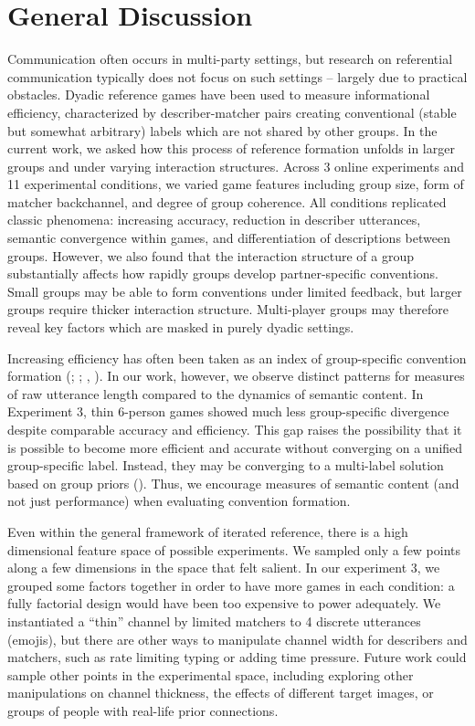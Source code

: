 \documentclass[
  english,
]{article}
\begin{document}
\section{General Discussion}\label{general-discussion}

Communication often occurs in multi-party settings, but research on referential communication typically does not focus on such settings -- largely due to practical obstacles.
Dyadic reference games have been used to measure informational efficiency, characterized by describer-matcher pairs creating conventional (stable but somewhat arbitrary) labels which are not shared by other groups.
In the current work, we asked how this process of reference formation unfolds in larger groups and under varying interaction structures.
Across 3 online experiments and 11 experimental conditions, we varied game features including group size, form of matcher backchannel, and degree of group coherence.
All conditions replicated classic phenomena: increasing accuracy, reduction in describer utterances, semantic convergence within games, and differentiation of descriptions between groups.
However, we also found that the interaction structure of a group substantially affects how rapidly groups develop partner-specific conventions.
Small groups may be able to form conventions under limited feedback, but larger groups require thicker interaction structure.
Multi-player groups may therefore reveal key factors which are masked in purely dyadic settings.

Increasing efficiency has often been taken as an index of group-specific convention formation (; ; , ).
In our work, however, we observe distinct patterns for measures of raw utterance length compared to the dynamics of semantic content.
In Experiment 3, thin 6-person games showed much less group-specific divergence despite comparable accuracy and efficiency.
This gap raises the possibility that it is possible to become more efficient and accurate without converging on a unified group-specific label.
Instead, they may be converging to a multi-label solution based on group priors ().
Thus, we encourage measures of semantic content (and not just performance) when evaluating convention formation.

Even within the general framework of iterated reference, there is a high dimensional feature space of possible experiments. We sampled only a few points along a few dimensions in the space that felt salient. In our experiment 3, we grouped some factors together in order to have more games in each condition: a fully factorial design would have been too expensive to power adequately. We instantiated a ``thin'' channel by limited matchers to 4 discrete utterances (emojis), but there are other ways to manipulate channel width for describers and matchers, such as rate limiting typing or adding time pressure. Future work could sample other points in the experimental space, including exploring other manipulations on channel thickness, the effects of different target images, or groups of people with real-life prior connections.
\end{document}
